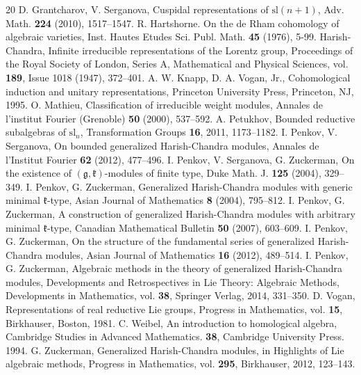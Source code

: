 \documentclass{tglat2e}
\theoremstyle{definition}
\theoremstyle{remark}
\newcommand{\kk}{\mathfrak{k}}
\renewcommand{\gg}{\mathfrak{g}}
\begin{document}
\begin{thebibliography}{20}
 D. Grantcharov, V. Serganova, {Cuspidal representations of $\mathrm{sl}(n+1)$}, Adv. Math. {\bf 224} (2010), 1517--1547.
 R. Hartshorne. {On the de Rham cohomology of algebraic varieties}, Inst. Hautes Etudes Sci. Publ. Math. {\bf45} (1976), 5-99. 
 Harish-Chandra, {Infinite irreducible representations of the Lorentz group}, Proceedings of the Royal Society of London, Series A, Mathematical and Physical Sciences, vol. {\bf189}, Issue 1018 (1947), 372--401.
 A. W. Knapp, D. A. Vogan, Jr., {Cohomological induction and unitary representations}, Princeton University Press, Princeton, NJ, 1995.         
 O. Mathieu, {Classification of irreducible weight modules}, Annales de l'institut Fourier (Grenoble) \textbf{50} (2000), 537--592.
 A. Petukhov, {Bounded reductive subalgebras of $\mathrm{sl}_n$}, Transformation Groups \textbf{16}, 2011, 1173--1182.
 I. Penkov, V. Serganova, {On bounded generalized Harish-Chandra modules}, Annales de l'Institut Fourier \textbf{62} (2012), 477--496.
 I. Penkov, V. Serganova, G. Zuckerman, {On the existence of $(\gg,\kk)$-modules of finite type}, Duke Math. J. \textbf{125} (2004), 329--349.
 I. Penkov, G. Zuckerman, {Generalized Harish-Chandra modules with generic minimal $\kk$-type}, Asian Journal of Mathematics \textbf{8} (2004), 795--812.
 I. Penkov, G. Zuckerman, {A construction of generalized Harish-Chandra modules with arbitrary minimal $\kk$-type}, Canadian Mathematical Bulletin \textbf{50} (2007), 603--609.
 I. Penkov, G. Zuckerman, {On the structure of the fundamental series of generalized Harish-Chandra modules}, Asian Journal of Mathematics \textbf{16} (2012), 489--514.
 I. Penkov, G. Zuckerman, {Algebraic methods in the theory of generalized Harish-Chandra modules}, Developments and Retrospectives in Lie Theory: Algebraic Methods, Developments in Mathematics, vol. \textbf{38}, Springer Verlag, 2014, 331--350.
 D. Vogan, {Representations of real reductive Lie groups}, Progress in Mathematics, vol. \textbf{15}, Birkhauser, Boston, 1981.
 C. Weibel, {An introduction to homological algebra}, Cambridge Studies in Advanced Mathematics. \textbf{38}, Cambridge University Press. 1994.
 G. Zuckerman, {Generalized Harish-Chandra modules},
  in {Highlights of Lie algebraic methods}, Progress in Mathematics,
  vol. \textbf{295}, Birkhauser, 2012, 123--143.
\end{thebibliography}
\end{document}
